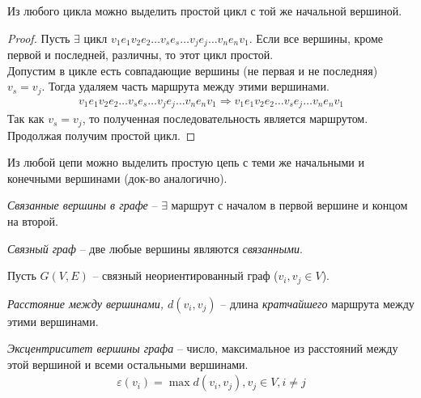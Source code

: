 \begin{theorem}
    Из любого цикла можно выделить простой цикл с той же начальной вершиной.
\end{theorem}

\begin{proof}
    Пусть $\exists \text{ цикл } v_1e_1v_2e_2 \dots v_se_s \dots v_je_j \dots v_ne_nv_1$.
    Если все вершины, кроме первой и последней, различны, то этот цикл простой. \\
    Допустим в цикле есть совпадающие вершины (не первая и не последняя) $v_s=v_j$. Тогда
    удаляем часть маршрута между этими вершинами.
    \begin{align*}
        v_1e_1v_2e_2 \dots v_se_s \dots v_je_j \dots v_ne_nv_1 \Rightarrow
        v_1e_1v_2e_2 \dots v_se_j \dots v_ne_nv_1
    \end{align*}
    Так как $v_s=v_j$, то полученная последовательность является маршрутом.
    Продолжая получим простой цикл.
\end{proof}

\begin{theorem}
    Из любой цепи можно выделить простую цепь с теми же
    начальными и конечными вершинами (док-во аналогично).
\end{theorem}

\begin{definition}
    \textit{Связанные вершины в графе} -- $\exists$ маршрут
    с началом в первой вершине и концом на второй.
\end{definition}

\begin{definition}
    \textit{Связный граф} -- две любые вершины являются \textit{связанными}.
\end{definition}

Пусть $G(V,E)$ -- связный неориентированный граф ($v_i,v_j \in V$).

\begin{definition}
    \textit{Расстояние между вершинами, $d(v_i,v_j)$} -- длина
    \textit{кратчайшего} маршрута между этими вершинами.
\end{definition}

\begin{definition}
    \textit{Эксцентриситет вершины графа} -- число, максимальное
    из расстояний между этой вершиной и всеми остальными вершинами.
    \begin{align*}
        \varepsilon(v_i) = \max d(v_i,v_j), v_j \in V, i \neq j
    \end{align*}
\end{definition}

